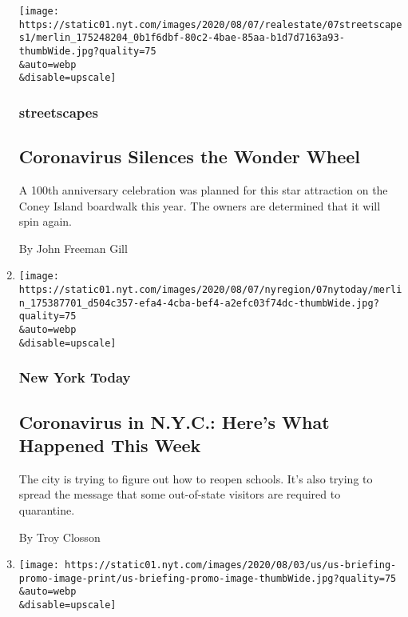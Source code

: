 \begin{enumerate}
  \texttt{[image: https://static01.nyt.com/images/2020/08/07/realestate/07streetscapes1/merlin\_175248204\_0b1f6dbf-80c2-4bae-85aa-b1d7d7163a93-thumbWide.jpg?quality=75\\\&auto=webp\\\&disable=upscale]}

  \hypertarget{streetscapes}{%
  \subsubsection{streetscapes}\label{streetscapes}}

  \hypertarget{coronavirus-silences-the-wonder-wheel}{%
  \subsection{Coronavirus Silences the Wonder
  Wheel}\label{coronavirus-silences-the-wonder-wheel}}

  A 100th anniversary celebration was planned for this star attraction
  on the Coney Island boardwalk this year. The owners are determined
  that it will spin again.

  By John Freeman Gill
\item
  \href{/2020/08/07/nyregion/coronavirus-nyc.html}{}

  \texttt{[image: https://static01.nyt.com/images/2020/08/07/nyregion/07nytoday/merlin\_175387701\_d504c357-efa4-4cba-bef4-a2efc03f74dc-thumbWide.jpg?quality=75\\\&auto=webp\\\&disable=upscale]}

  \hypertarget{new-york-today}{%
  \subsubsection{New York Today}\label{new-york-today}}

  \hypertarget{coronavirus-in-nyc-heres-what-happened-this-week}{%
  \subsection{Coronavirus in N.Y.C.: Here's What Happened This
  Week}\label{coronavirus-in-nyc-heres-what-happened-this-week}}

  The city is trying to figure out how to reopen schools. It's also
  trying to spread the message that some out-of-state visitors are
  required to quarantine.~

  By Troy Closson
\item
  \href{/2020/08/07/world/covid-19-news.html}{}

  \texttt{[image: https://static01.nyt.com/images/2020/08/03/us/us-briefing-promo-image-print/us-briefing-promo-image-thumbWide.jpg?quality=75\\\&auto=webp\\\&disable=upscale]}


\end{enumerate}
